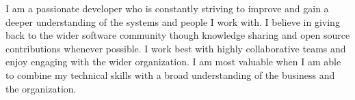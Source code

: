 %
%
%
\par{
I am a passionate developer who is constantly striving to improve and gain a deeper understanding of the
systems and people I work with. I believe in giving back to the wider software community though knowledge sharing and open source contributions whenever possible. I work best with highly collaborative teams and enjoy engaging with the wider organization. I am most valuable when I am able to combine my technical skills with a broad understanding of the business and the organization.
}